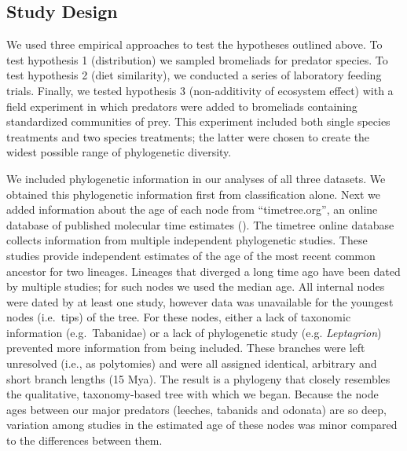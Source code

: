 \documentclass[11pt]{article}
\begin{document}
\subsection*{Study Design}

We used three empirical approaches to test the hypotheses outlined
above. To test hypothesis 1 (distribution) we sampled bromeliads for
predator species. To test hypothesis 2 (diet similarity), we conducted a
series of laboratory feeding trials. Finally, we tested hypothesis 3
(non-additivity of ecosystem effect) with a field experiment
in which predators were added to bromeliads containing standardized
communities of prey. This experiment included both single species
treatments and two species treatments; the latter were chosen to create
the widest possible range of phylogenetic diversity.

We included phylogenetic information in our analyses of all three
datasets. We obtained this phylogenetic information first from
classification alone. Next we added information about the age of each
node from ``timetree.org'', an online database of published molecular
time estimates (\citealt{Hedges2006}). The timetree online database collects
information from multiple independent phylogenetic studies. These
studies provide independent estimates of the age of the most recent
common ancestor for two lineages. Lineages that diverged a long time ago
have been dated by multiple studies; for such nodes we used the median
age. All internal nodes were dated by at least one study, however data
was unavailable for the youngest nodes (i.e.~tips) of the tree. For
these nodes, either a lack of taxonomic information (e.g.~Tabanidae) or
a lack of phylogenetic study (e.g. \emph{Leptagrion}) prevented more
information from being included. These branches were left unresolved
(i.e., as polytomies) and were all assigned identical, arbitrary and
short branch lengths (15 Mya). The result is a phylogeny that closely
resembles the qualitative, taxonomy-based tree with which we began.
Because the node ages between our major predators (leeches, tabanids and
odonata) are so deep, variation among studies in the estimated age of
these nodes was minor compared to the differences between them.
\end{document}
